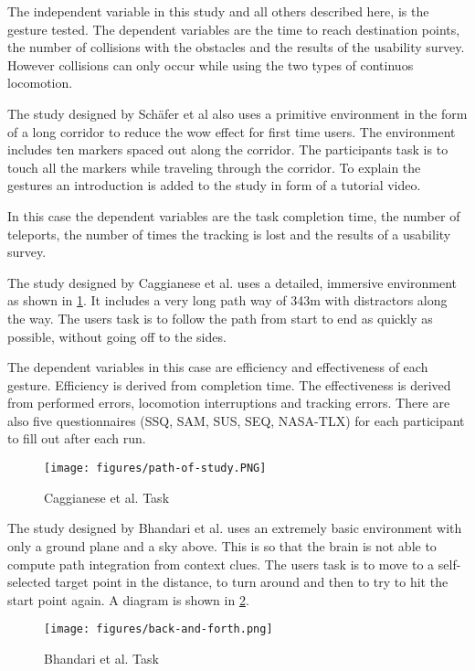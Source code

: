 The independent variable in this study and all others described here, is the gesture tested. The dependent variables are the time to reach destination points, the number of collisions with the obstacles and the results of the usability survey. 
However collisions can only occur while using the two types of continuos locomotion. 



The study designed by Schäfer et al \cite{Schafer2021} also uses a primitive environment in the form of a long corridor to reduce the wow effect for first time users. The environment includes ten markers spaced out along the corridor. The participants task is to touch all the markers while traveling through the corridor. To explain the gestures an introduction is added to the study in form of a tutorial video.

In this case the dependent variables are the task completion time, the number of teleports, the number of times the tracking is lost and the results of a usability survey.


The study designed by Caggianese et al. \cite{Caggianese} uses a detailed, immersive environment as shown in \ref{fig:path}. It includes a very long path way of 343m with distractors along the way. The users task is to follow the path from start to end as quickly as possible, without going off to the sides.

The dependent variables in this case are efficiency and effectiveness of each gesture. Efficiency is derived from completion time. The effectiveness is derived from performed errors, locomotion interruptions and tracking errors. There are also five questionnaires (SSQ, SAM, SUS, SEQ, NASA-TLX) for each participant to fill out after each run.

\begin{figure}[hbt!]
  \centering
  \texttt{[image: figures/path-of-study.PNG]}
  \caption{Caggianese et al. \cite{Caggianese} Task}
  \label{fig:path}
\end{figure}


The study designed by Bhandari et al. \cite{Bhandari} uses an extremely basic environment with only a ground plane and a sky above. This is so that the brain is not able to compute path integration from context clues. The users task is to move to a self-selected target point in the distance, to turn around and then to try to hit the start point again. A diagram is shown in \ref{fig:backAndForth}.

\begin{figure}[hbt!]
  \centering
  \texttt{[image: figures/back-and-forth.png]}
  \caption{Bhandari et al. \cite{Bhandari} Task}
  \label{fig:backAndForth}
\end{figure}


